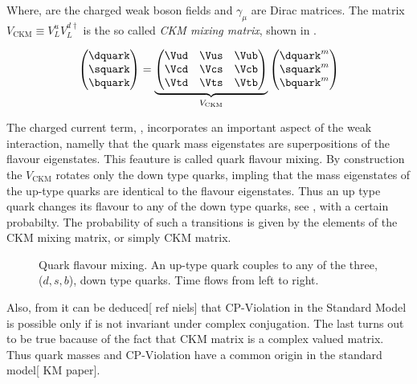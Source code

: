 \noindent Where, \Wpm are the charged weak boson fields and $\gamma_\mu$ are Dirac matrices.
The matrix $V_{\text{CKM}} \equiv V^u_LV^{d\dagger}_L$ is the so called {\it CKM mixing matrix}, shown in .

\begin{equation}
  \begin{pmatrix} \dquark \\ \squark \\ \bquark  \end{pmatrix} =
  \underbrace{\begin{pmatrix} \Vud & \Vus & \Vub \\ \Vcd & \Vcs & \Vcb \\ \Vtd & \Vts & \Vtb \end{pmatrix}}_{V_{\text{CKM}}}
    \begin{pmatrix} \dquark^m \\ \squark^m \\ \bquark^m  \end{pmatrix}
  \label{quark_field_rotation}
  \end{equation}

The charged current term, , incorporates an important aspect of the weak interaction,
namelly that the quark mass eigenstates are superpositions of the flavour eigenstates. This feauture is called
quark flavour mixing. By construction the $V_{\text{CKM}}$ rotates only the down type quarks, impling that
the mass eigenstates of the up-type quarks are identical to the flavour eigenstates. Thus an up type quark
changes its flavour to any of the down type quarks, see , with a certain probabilty.
The probability of such a transitions is given by the elements of the CKM mixing matrix, or simply CKM matrix.

\begin{figure}[h]
  \centering
  {\sffamily }
  \caption{Quark flavour mixing. An up-type quark couples to any of the three, ($d,s,b$), down type quarks.
           Time flows from left to right.}
  \label{QuarkMixing}
\end{figure}

\noindent Also, from  it can be deduced[{\color{red} ref niels}] that CP-Violation
in the Standard Model is possible only if  is not invariant under complex conjugation.
The last turns out to be true bacause of the fact that CKM matrix is a complex valued matrix.
Thus quark masses and CP-Violation have a common origin in the standard model[{\color{red} KM paper}].

